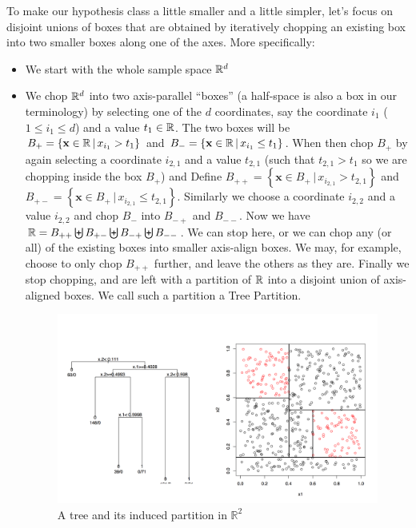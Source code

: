 \documentclass[11pt]{article}
\newcommand{\R}{\ensuremath{\mathbb{R}}}
\newcommand{\VV}[1]{\mathbf{#1}}
\begin{document}
 To make our hypothesis class a little smaller and a little simpler, let's focus
 on  disjoint unions of boxes that are obtained by iteratively chopping an
 existing box into two smaller boxes along one of the axes. More specifically:
 \begin{itemize}
   \item We start with the whole sample space $\mathbb{R}^d$
   \item We chop $\mathbb{R}^d$ into two axis-parallel ``boxes'' (a half-space is
     also a box in our terminology) by selecting one of the $d$ coordinates, say
     the coordinate $i_1$
     ($1\leq i_1 \leq d$) and a value $t_1\in\mathbb{R}$. The two boxes will
     be $B_+=\left\{ \VV{x}\in\reals\,|\, x_{i_1}>t_1 \right\}$ and 
     $B_-=\left\{ \VV{x}\in\reals\,|\, x_{i_1}\leq t_1 \right\}$.
     When then chop $B_+$ by again selecting a coordinate $i_{2,1}$ and a value
     $t_{2,1}$ (such that $t_{2,1}>t_1$ so we are chopping inside the box $B_+$)
     and Define $B_{++} = \left\{ \VV{x}\in B_+\,|\, x_{i_{2,1}}>t_{2,1} \right\}$
     and  $B_{+-} = \left\{ \VV{x}\in B_+\,|\, x_{i_{2,1}}\leq t_{2,1}
     \right\}$.
     Similarly we choose a coordinate $i_{2,2}$ and a value $i_{2,2}$ and chop
     $B_-$ into  $B_{-+}$ and  $B_{--}$. Now we have $\mathbb{R} = B_{++} \biguplus
     B_{+-} \biguplus
     B_{-+} \biguplus
     B_{--} $. We can stop here, or we can chop any (or all) of the existing
     boxes into smaller axis-align boxes. We may, for example, choose to only
     chop $B_{++}$   further, and leave the others as they are. 
     Finally we stop chopping, and are left with a partition of $\mathbb{R}$ into a
     disjoint union of axis-aligned boxes. We call such a partition a Tree
     Partition. 
     
     \begin{figure}[h!]
       \centering
       \includegraphics[width=5in]{tree2.png}
       \caption{A tree and its induced partition in $\R^2$}
     \end{figure}
     

\end{itemize}
\end{document}
